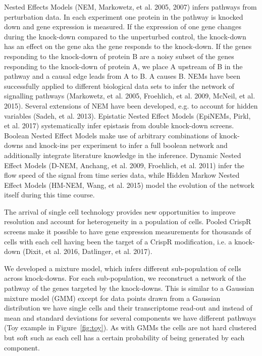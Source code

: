 \documentclass[12pt]{article}
\begin{document}
Nested Effects Models (NEM, Markowetz, et al. 2005, 2007) infers pathways from perturbation data. In each experiment one protein in the pathway is knocked down and gene expression is measured. If the expression of one gene changes during the knock-down compared to the unperturbed control, the knock-down has an effect on the gene aka the gene responds to the knock-down. If the genes responding to the knock-down of protein B are a noisy subset of the genes responding to the knock-down of protein A, we place A upstream of B in the pathway and a causal edge leads from A to B. A causes B. NEMs have been successfully applied to different biological data sets to infer the network of signalling pathways (Markowetz, et al. 2005, Froehlich, et al. 2009, McNeil, et al. 2015). Several extensions of NEM have been developed, e.g. to account for hidden variables (Sadeh, et al. 2013). Epistatic Nested Effect Models (EpiNEMs, Pirkl, et al. 2017) systematically infer epistasis from double knock-down screens. Boolean Nested Effect Models make use of arbitrary combinations of knock-downs and knock-ins per experiment to infer a full boolean network and additionally integrate literature knowledge in the inference. Dynamic Nested Effect Models (D-NEM, Anchang, et al. 2009, Froehlich, et al. 2011) infer the flow speed of the signal from time series data, while Hidden Markow Nested Effect Models (HM-NEM, Wang, et al. 2015) model the evolution of the network itself during this time course.

The arrival of single cell technology provides new opportunities to improve resolution and account for heterogeneity in a population of cells. Pooled CrispR screens make it possible to have gene expression measurements for thousands of cells with each cell having been the target of a CrispR modification, i.e. a knock-down (Dixit, et al. 2016, Datlinger, et al. 2017).

We developed a mixture model, which infers different sub-population of cells across knock-downs. For each sub-population, we reconstruct a network of the pathway of the genes targeted by the knock-downs. This is similar to a Gaussian mixture model (GMM) except for data points drawn from a Gaussian distribution we have single cells and their transcriptome read-out and instead of mean and standard deviations for several components we have different pathways (Toy example in Figure~\ref{fig:toy}). As with GMMs the cells are not hard clustered but soft such as each cell has a certain probability of being generated by each component.
\end{document}
